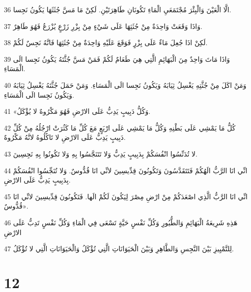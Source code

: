 \par 36 الَّا الْعَيْنَ وَالْبِئْرَ مُجْتَمَعَيِ الْمَاءِ تَكُونَانِ طَاهِرَتَيْنِ. لَكِنْ مَا مَسَّ جُثَثَهَا يَكُونُ نَجِسا.
\par 37 وَاذَا وَقَعَتْ وَاحِدَةٌ مِنْ جُثَثِهَا عَلَى شَيْءٍ مِنْ بِزْرِ زَرْعٍ يُزْرَعُ فَهُوَ طَاهِرٌ.
\par 38 لَكِنْ اذَا جُعِلَ مَاءٌ عَلَى بِزْرٍ فَوَقَعَ عَلَيْهِ وَاحِدَةٌ مِنْ جُثَثِهَا فَانَّهُ نَجِسٌ لَكُمْ.
\par 39 وَاذَا مَاتَ وَاحِدٌ مِنَ الْبَهَائِمِ الَّتِي هِيَ طَعَامٌ لَكُمْ فَمَنْ مَسَّ جُثَّتَهُ يَكُونُ نَجِسا الَى الْمَسَاءِ.
\par 40 وَمَنْ اكَلَ مِنْ جُثَّتِهِ يَغْسِلُ ثِيَابَهُ وَيَكُونُ نَجِسا الَى الْمَسَاءِ. وَمَنْ حَمَلَ جُثَّتَهُ يَغْسِلُ ثِيَابَهُ وَيَكُونُ نَجِسا الَى الْمَسَاءِ.
\par 41 «وَكُلُّ دَبِيبٍ يَدِبُّ عَلَى الارْضِ فَهُوَ مَكْرُوهٌ لا يُؤْكَلُ.
\par 42 كُلُّ مَا يَمْشِي عَلَى بَطْنِهِ وَكُلُّ مَا يَمْشِي عَلَى ارْبَعٍ مَعَ كُلِّ مَا كَثُرَتْ ارْجُلُهُ مِنْ كُلِّ دَبِيبٍ يَدِبُّ عَلَى الارْضِ لا تَاكُلُوهُ لانَّهُ مَكْرُوهٌ.
\par 43 لا تُدَنِّسُوا انْفُسَكُمْ بِدَبِيبٍ يَدِبُّ وَلا تَتَنَجَّسُوا بِهِ وَلا تَكُونُوا بِهِ نَجِسِينَ.
\par 44 انِّي انَا الرَّبُّ الَهُكُمْ فَتَتَقَدَّسُونَ وَتَكُونُونَ قِدِّيسِينَ لانِّي انَا قُدُّوسٌ. وَلا تُنَجِّسُوا انْفُسَكُمْ بِدَبِيبٍ يَدِبُّ عَلَى الارْضِ.
\par 45 انِّي انَا الرَّبُّ الَّذِي اصْعَدَكُمْ مِنْ ارْضِ مِصْرَ لِيَكُونَ لَكُمْ الَها. فَتَكُونُونَ قِدِّيسِينَ لانِّي انَا قُدُّوسٌ».
\par 46 هَذِهِ شَرِيعَةُ الْبَهَائِمِ وَالطُّيُورِ وَكُلِّ نَفْسٍ حَيَّةٍ تَسْعَى فِي الْمَاءِ وَكُلِّ نَفْسٍ تَدِبُّ عَلَى الارْضِ
\par 47 لِلتَّمْيِيزِ بَيْنَ النَّجِسِ وَالطَّاهِرِ وَبَيْنَ الْحَيَوَانَاتِ الَّتِي تُؤْكَلُ وَالْحَيَوَانَاتِ الَّتِي لا تُؤْكَلُ.

\chapter{12}

